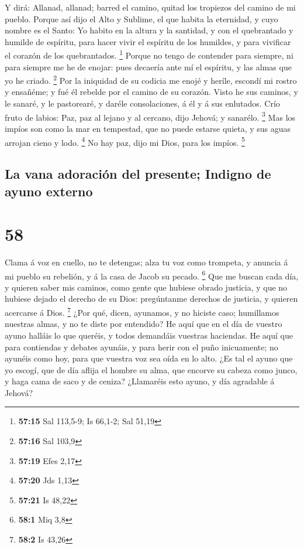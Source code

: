  Y dirá: Allanad, allanad; barred el camino, quitad los
tropiezos del camino de mi pueblo.  Porque así dijo el
Alto y Sublime, el que habita la eternidad, y cuyo nombre es el Santo:
Yo habito en la altura y la santidad, y con el quebrantado y humilde de
espíritu, para hacer vivir el espíritu de los humildes, y para vivificar
el corazón de los quebrantados. \footnote{\textbf{57:15} Sal 113,5-9; Is
  66,1-2; Sal 51,19}  Porque no tengo de contender para
siempre, ni para siempre me he de enojar: pues decaería ante mí el
espíritu, y las almas que yo he criado. \footnote{\textbf{57:16} Sal
  103,9}  Por la iniquidad de su codicia me enojé y
heríle, escondí mi rostro y ensañéme; y fué él rebelde por el camino de
su corazón.  Visto he sus caminos, y le sanaré, y le
pastorearé, y daréle consolaciones, á él y á sus enlutados.
 Crío fruto de labios: Paz, paz al lejano y al cercano,
dijo Jehová; y sanarélo. \footnote{\textbf{57:19} Efes 2,17}
 Mas los impíos son como la mar en tempestad, que no
puede estarse quieta, y sus aguas arrojan cieno y lodo. \footnote{\textbf{57:20}
  Jds 1,13}  No hay paz, dijo mi Dios, para los impíos.
\footnote{\textbf{57:21} Is 48,22}

\hypertarget{la-vana-adoraciuxf3n-del-presente-indigno-de-ayuno-externo}{%
\subsection{La vana adoración del presente; Indigno de ayuno
externo}\label{la-vana-adoraciuxf3n-del-presente-indigno-de-ayuno-externo}}

\hypertarget{section-57}{%
\section{58}\label{section-57}}

 Clama á voz en cuello, no te detengas; alza tu voz como
trompeta, y anuncia á mi pueblo su rebelión, y á la casa de Jacob su
pecado. \footnote{\textbf{58:1} Miq 3,8}  Que me buscan
cada día, y quieren saber mis caminos, como gente que hubiese obrado
justicia, y que no hubiese dejado el derecho de su Dios: pregúntanme
derechos de justicia, y quieren acercarse á Dios. \footnote{\textbf{58:2}
  Is 43,26}  ¿Por qué, dicen, ayunamos, y no hiciste caso;
humillamos nuestras almas, y no te diste por entendido? He aquí que en
el día de vuestro ayuno halláis lo que queréis, y todos demandáis
vuestras haciendas.  He aquí que para contiendas y debates
ayunáis, y para herir con el puño inicuamente; no ayunéis como hoy, para
que vuestra voz sea oída en lo alto.  ¿Es tal el ayuno que
yo escogí, que de día aflija el hombre su alma, que encorve su cabeza
como junco, y haga cama de saco y de ceniza? ¿Llamaréis esto ayuno, y
día agradable á Jehová?

